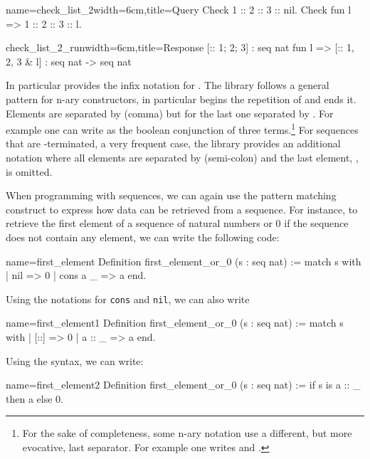 \begin{coq}{name=check_list_2}{width=6cm,title=Query}
Check 1 :: 2 :: 3 :: nil.
Check fun l => 1 :: 2 :: 3 :: l.
$~$
\end{coq}
\begin{coqout}{check_list_2_run}{width=6cm,title=Response}
[:: 1; 2; 3] : seq nat
fun l => [:: 1, 2, 3 & l]
  : seq nat -> seq nat
\end{coqout}
\index[coq]{\C{[:: .. , .. & ..]}}

In particular \Coq{} provides the infix notation \C{::} for
.  The \mcbMC{} library follows a general pattern for
n-ary constructors, in particular \C{[::} begins the repetition
of \C{::} and \C{]} ends it.  Elements are separated by \C{,} (comma)
but for the last one separated by \C{&}.
For example one
can write as  the boolean conjunction
of three terms.\footnote{For the sake of completeness, some n-ary notation use a
different, but more evocative, last separator.  For example one writes
\C{[|| b1, b2 | b3]} and \C{[==> b1, b2 => b3]}.}
\index[coq]{\C{["|"| .. , .. "| ..]}}
\index[coq]{\C{[&& .. , .. & ..]}}
\index[coq]{\C{[==> .. , .. => ..]}}
For sequences that are -terminated, a very frequent case,
the \mcbMC{} library provides an additional notation where all elements are
separated by \C{;} (semi-colon) and the last element, ,
is omitted.
\index[coq]{\C{[seq .. ; ..]}}

When programming with sequences, we can again use the  pattern matching
construct to express how data can be retrieved from a sequence.  For
instance, to retrieve the first element of a sequence of natural numbers
or 0 if the sequence does not contain any element, we can write the
following code:

\begin{coq}{name=first_element}{}
Definition first_element_or_0 (s : seq nat) :=
  match s with
  | nil => 0
  | cons a _ => a
  end.
\end{coq}
Using the notations for {\tt cons} and {\tt nil}, we can also write

\begin{coq}{name=first_element1}{}
Definition first_element_or_0 (s : seq nat) :=
  match s with
  | [::] => 0
  | a :: _ => a
  end.
\end{coq}
Using the  syntax, we can write:

\begin{coq}{name=first_element2}{}
Definition first_element_or_0 (s : seq nat) :=
  if s is a :: _ then a else 0.
\end{coq}
